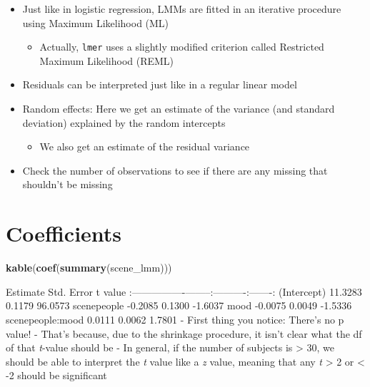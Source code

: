\documentclass[]{article}
\newenvironment{Shaded}{}{}
\newcommand{\KeywordTok}[1]{\textcolor[rgb]{0.00,0.44,0.13}{\textbf{{#1}}}}
\newcommand{\NormalTok}[1]{{#1}}
\begin{document}
\begin{itemize}
\itemsep1pt\parskip0pt
\item
  Just like in logistic regression, LMMs are fitted in an iterative
  procedure using Maximum Likelihood (ML)

  \begin{itemize}
  \itemsep1pt\parskip0pt
  \item
    Actually, \texttt{lmer} uses a slightly modified criterion called
    Restricted Maximum Likelihood (REML)
  \end{itemize}
\item
  Residuals can be interpreted just like in a regular linear model
\item
  Random effects: Here we get an estimate of the variance (and standard
  deviation) explained by the random intercepts

  \begin{itemize}
  \itemsep1pt\parskip0pt
  \item
    We also get an estimate of the residual variance
  \end{itemize}
\item
  Check the number of observations to see if there are any missing that
  shouldn't be missing
\end{itemize}

\section{Coefficients}\label{coefficients}

\begin{Shaded}
\begin{Highlighting}[]
\KeywordTok{kable}\NormalTok{(}\KeywordTok{coef}\NormalTok{(}\KeywordTok{summary}\NormalTok{(scene_lmm)))}
\end{Highlighting}
\end{Shaded}

\textbar{} \textbar{} Estimate\textbar{} Std. Error\textbar{} t
value\textbar{}
\textbar{}:----------------\textbar{}--------:\textbar{}----------:\textbar{}-------:\textbar{}
\textbar{}(Intercept) \textbar{} 11.3283\textbar{} 0.1179\textbar{}
96.0573\textbar{} \textbar{}scenepeople \textbar{} -0.2085\textbar{}
0.1300\textbar{} -1.6037\textbar{} \textbar{}mood \textbar{}
-0.0075\textbar{} 0.0049\textbar{} -1.5336\textbar{}
\textbar{}scenepeople:mood \textbar{} 0.0111\textbar{} 0.0062\textbar{}
1.7801\textbar{} - First thing you notice: There's no p value! - That's
because, due to the shrinkage procedure, it isn't clear what the df of
that \emph{t}-value should be - In general, if the number of subjects is
\textgreater{} 30, we should be able to interpret the \emph{t} value
like a \emph{z} value, meaning that any \emph{t} \textgreater{} 2 or
\textless{} -2 should be significant
\end{document}
